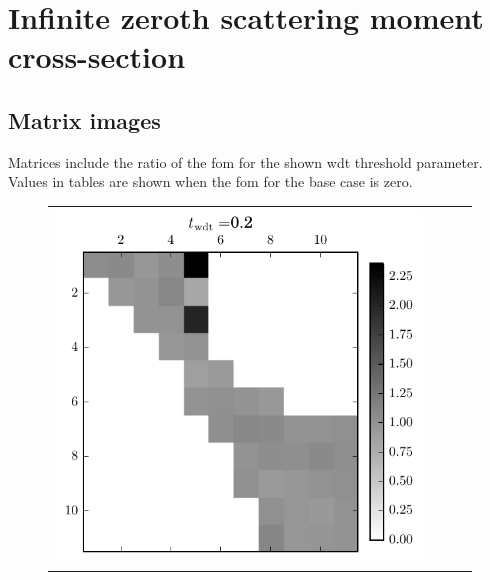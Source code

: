 \begin{landscape}
\newpage
\end{landscape}
\section{Infinite zeroth scattering moment cross-section}
\label{sec:homog_inf_sp0_data}

\subsection{Matrix images}
\label{sec:homog_inf_sp0_mat}
Matrices include the ratio of the \gls{fom} for the shown \gls{wdt}
threshold parameter. Values in tables are shown when the \gls{fom} for
the base case is zero.

\begin{figure}[h]
  \centering
  \begin{tabular}{cccc}
    \includegraphics[scale=0.75]{images/results/matshows/homog_sp0_matshow_1}
    &

\end{tabular}
\end{figure}
